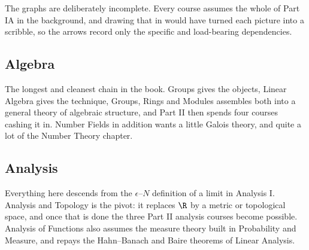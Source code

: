 \begin{center}
\end{center}

The graphs are deliberately incomplete. Every course assumes the whole of Part IA in
the background, and drawing that in would have turned each picture into a scribble, so
the arrows record only the specific and load-bearing dependencies.

\subsection*{Algebra}

The longest and cleanest chain in the book. Groups gives the objects, Linear Algebra
gives the technique, Groups, Rings and Modules assembles both into a general theory of
algebraic structure, and Part II then spends four courses cashing it in. Number Fields
in addition wants a little Galois theory, and quite a lot of the Number Theory chapter.

\begin{center}
\end{center}

\subsection*{Analysis}

Everything here descends from the $\epsilon$--$N$ definition of a limit in Analysis I\@.
Analysis and Topology is the pivot: it replaces $\R$ by a metric or topological space,
and once that is done the three Part II analysis courses become possible. Analysis of
Functions also assumes the measure theory built in Probability and Measure, and repays
the Hahn--Banach and Baire theorems of Linear Analysis.

